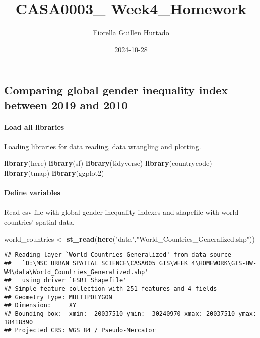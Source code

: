 \documentclass[
]{article}
\title{CASA0003\_ Week4\_Homework}
\author{Fiorella Guillen Hurtado}
\date{2024-10-28}
\newenvironment{Shaded}{\begin{snugshade}}{\end{snugshade}}
\newcommand{\FunctionTok}[1]{\textcolor[rgb]{0.13,0.29,0.53}{\textbf{#1}}}
\newcommand{\NormalTok}[1]{#1}
\newcommand{\OtherTok}[1]{\textcolor[rgb]{0.56,0.35,0.01}{#1}}
\newcommand{\StringTok}[1]{\textcolor[rgb]{0.31,0.60,0.02}{#1}}
\begin{document}
\maketitle

\subsection{Comparing global gender inequality index between 2019 and
2010}\label{comparing-global-gender-inequality-index-between-2019-and-2010}

\paragraph{Load all libraries}\label{load-all-libraries}

Loading libraries for data reading, data wrangling and plotting.

\begin{Shaded}
\begin{Highlighting}[]
\FunctionTok{library}\NormalTok{(here)}
\FunctionTok{library}\NormalTok{(sf)}
\FunctionTok{library}\NormalTok{(tidyverse)}
\FunctionTok{library}\NormalTok{(countrycode)}
\FunctionTok{library}\NormalTok{(tmap)}
\FunctionTok{library}\NormalTok{(ggplot2)}
\end{Highlighting}
\end{Shaded}

\paragraph{Define variables}\label{define-variables}

Read csv file with global gender inequality indexes and shapefile with
world countries' spatial data.

\begin{Shaded}
\begin{Highlighting}[]
\NormalTok{world\_countries }\OtherTok{\textless{}{-}} \FunctionTok{st\_read}\NormalTok{(}\FunctionTok{here}\NormalTok{(}\StringTok{"data"}\NormalTok{,}\StringTok{"World\_Countries\_Generalized.shp"}\NormalTok{))}
\end{Highlighting}
\end{Shaded}

\begin{verbatim}
## Reading layer `World_Countries_Generalized' from data source 
##   `D:\MSC URBAN SPATIAL SCIENCE\CASA005 GIS\WEEK 4\HOMEWORK\GIS-HW-W4\data\World_Countries_Generalized.shp' 
##   using driver `ESRI Shapefile'
## Simple feature collection with 251 features and 4 fields
## Geometry type: MULTIPOLYGON
## Dimension:     XY
## Bounding box:  xmin: -20037510 ymin: -30240970 xmax: 20037510 ymax: 18418390
## Projected CRS: WGS 84 / Pseudo-Mercator
\end{verbatim}
\end{document}
